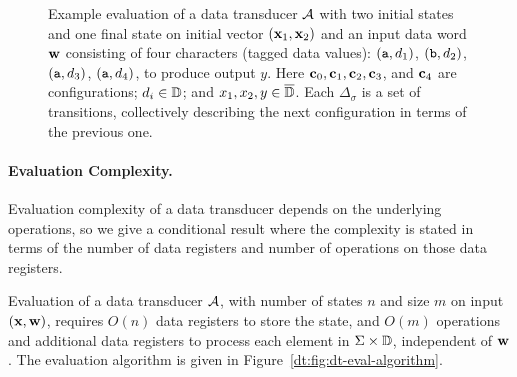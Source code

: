 \begin{figure}[t]
\centering \small
{}
\caption{Example evaluation of a data transducer $\mathcal{A}$ with two initial states and one final state on initial vector $(\textbf{x}_1, \textbf{x}_2)$ and an input data word $\textbf{w}$ consisting of four characters (tagged data values):
$(\texttt{a},d_1)$, $(\texttt{b},d_2)$, $(\texttt{a},d_3)$, $(\texttt{a}, d_4)$, to produce output $y$.
Here $\textbf{c}_0, \textbf{c}_1, \textbf{c}_2, \textbf{c}_3$, and $\textbf{c}_4$ are configurations; $d_i \in \mathbb{D}$; and $x_1, x_2, y \in \overline{\mathbb{D}{}}$. Each $\Delta_\sigma$ is a set of transitions, collectively describing the next configuration in terms of the previous one.}
\label{dt:fig:dt-eval-illustration}
\end{figure}

\paragraph*{Evaluation Complexity.}
Evaluation complexity of a data transducer depends on the underlying
operations, so we give a conditional result where the complexity
is stated in terms of the number of data registers and number of
operations on those data registers.

\begin{theorem}
Evaluation of a data transducer $\mathcal{A}$, with number of states $n$ and size $m$ on input $(\textbf{x},\textbf{w})$, requires
$O(n)$ data registers to store the state,
and $O(m)$ operations and additional data registers
to process each element in $\Sigma \times \mathbb{D}$, independent of $\textbf{w}$.
The evaluation algorithm is given in Figure~\ref{dt:fig:dt-eval-algorithm}.
\label{dt:thm:dt-eval}
\end{theorem}

